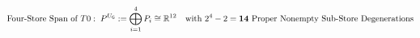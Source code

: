 \documentclass[preview]{standalone}
\begin{document}
\begin{align*}
\special{dvisvgm:raw <g id='unique000'>}\text{Four-Store Span of }T0:\; P^{U_{\mathsf{G}}} := \bigoplus_{i=1}^4 P_i \cong \mathbb{R}^{12} \quad \text{with }2^4 - 2 = \mathbf{14}\text{ Proper Nonempty Sub-Store Degenerations}\special{dvisvgm:raw </g>}
\end{align*}
\end{document}
